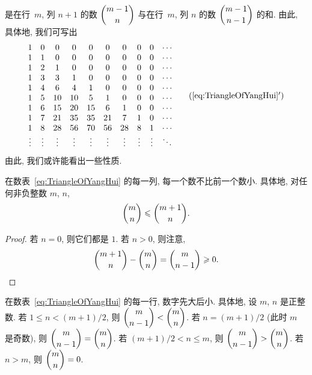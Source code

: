 \documentclass[../libro.tex]{subfiles}
\begin{document}
是在行~\(m\), 列 \(n+1\) 的数 \(\dbinom{m-1}{n}\)
与在行~\(m\), 列 \(n\) 的数 \(\dbinom{m-1}{n-1}\)
的和.
由此, 具体地, 我们可写出
\begin{align*}
    \begin{matrix}
        1 & 0 & 0 & 0 & 0 & 0 & 0 & 0 & 0 & \cdots \\
        1 & 1 & 0 & 0 & 0 & 0 & 0 & 0 & 0 & \cdots \\
        1 & 2 & 1 & 0 & 0 & 0 & 0 & 0 & 0 & \cdots \\
        1 & 3 & 3 & 1 & 0 & 0 & 0 & 0 & 0 & \cdots \\
        1 & 4 & 6 & 4 & 1 & 0 & 0 & 0 & 0 & \cdots \\
        1 & 5 & 10 & 10 & 5 & 1 & 0 & 0 & 0 & \cdots \\
        1 & 6 & 15 & 20 & 15 & 6 & 1 & 0 & 0 & \cdots \\
        1 & 7 & 21 & 35 & 35 & 21 & 7 & 1 & 0 & \cdots \\
        1 & 8 & 28 & 56 & 70 & 56 & 28 & 8 & 1 & \cdots \\
        \vdots & \vdots & \vdots & \vdots & \vdots & \vdots & \vdots & \vdots & \vdots & \ddots
    \end{matrix}
    \tag{\ref{eq:TriangleOfYangHui}\('\)}
\end{align*}
由此, 我们或许能看出一些性质.

\begin{theorem}
    在数表~\eqref{eq:TriangleOfYangHui} 的每一列,
    每一个数不比前一个数小.
    具体地, 对任何非负整数 \(m\), \(n\),
    \begin{align*}
        \dbinom{m}{n} \leq \dbinom{m+1}{n}.
    \end{align*}
\end{theorem}

\begin{proof}
    若 \(n = 0\), 则它们都是 \(1\).
    若 \(n > 0\), 则注意,
    \begin{equation*}
        \dbinom{m+1}{n} - \dbinom{m}{n} = \dbinom{m}{n-1} \geq 0.
        \qedhere
    \end{equation*}
\end{proof}

\begin{theorem}
    在数表~\eqref{eq:TriangleOfYangHui} 的每一行,
    数字先大后小.
    具体地, 设 \(m\), \(n\) 是正整数.
    若 \(1 \leq n < (m+1)/2\), 则
    \(\dbinom{m}{n-1} < \dbinom{m}{n}\).
    若 \(n = (m+1)/2\) (此时 \(m\) 是奇数), 则
    \(\dbinom{m}{n-1} = \dbinom{m}{n}\).
    若 \((m+1)/2 < n \leq m\), 则
    \(\dbinom{m}{n-1} > \dbinom{m}{n}\).
    若 \(n > m\), 则 \(\dbinom{m}{n} = 0\).
\end{theorem}
\end{document}
